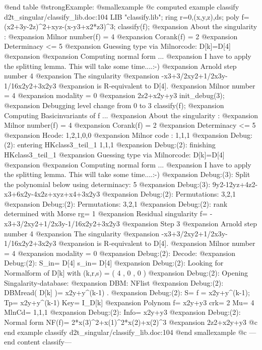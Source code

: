 @end table
@strong{Example:}
@smallexample
@c computed example classify d2t_singular/classify_lib.doc:104 
LIB "classify.lib";
ring r=0,(x,y,z),ds;
poly f=(x2+3y-2z)^2+xyz-(x-y3+x2*z3)^3;
classify(f);
@expansion{} About the singularity :
@expansion{}           Milnor number(f)   = 4
@expansion{}           Corank(f)          = 2
@expansion{}           Determinacy       <= 5
@expansion{} Guessing type via Milnorcode:   D[k]=D[4]
@expansion{} 
@expansion{} Computing normal form ...
@expansion{} I have to apply the splitting lemma. This will take some time....:-)
@expansion{}    Arnold step number 4
@expansion{} The singularity
@expansion{}    -x3+3/2xy2+1/2x3y-1/16x2y2+3x2y3
@expansion{} is R-equivalent to D[4].
@expansion{}    Milnor number = 4
@expansion{}    modality      = 0
@expansion{} 2z2+x2y+y3
init_debug(3);
@expansion{} Debugging level change from  0  to  3
classify(f);
@expansion{} Computing Basicinvariants of f ...
@expansion{} About the singularity :
@expansion{}           Milnor number(f)   = 4
@expansion{}           Corank(f)          = 2
@expansion{}           Determinacy       <= 5
@expansion{} Hcode: 1,2,1,0,0
@expansion{} Milnor code :  1,1,1
@expansion{} Debug:(2):  entering HKclass3_teil_1 1,1,1
@expansion{} Debug:(2):  finishing HKclass3_teil_1
@expansion{} Guessing type via Milnorcode:   D[k]=D[4]
@expansion{} 
@expansion{} Computing normal form ...
@expansion{} I have to apply the splitting lemma. This will take some time....:-)
@expansion{} Debug:(3):  Split the polynomial below using determinacy:  5
@expansion{} Debug:(3):  9y2-12yz+4z2-x3+6x2y-4x2z+xyz+x4+3x2y3
@expansion{} Debug:(2):  Permutations: 3,2,1
@expansion{} Debug:(2):  Permutations: 3,2,1
@expansion{} Debug:(2):  rank determined with Morse rg= 1
@expansion{} Residual singularity f= -x3+3/2xy2+1/2x3y-1/16x2y2+3x2y3
@expansion{} Step 3
@expansion{}    Arnold step number 4
@expansion{} The singularity
@expansion{}    -x3+3/2xy2+1/2x3y-1/16x2y2+3x2y3
@expansion{} is R-equivalent to D[4].
@expansion{}    Milnor number = 4
@expansion{}    modality      = 0
@expansion{} Debug:(2):  Decode:
@expansion{} Debug:(2):  S_in= D[4]   s_in= D[4]                          
@expansion{} Debug:(2):  Looking for Normalform of  D[k] with (k,r,s) = ( 4 , 0 , 0 )
@expansion{} Debug:(2):  Opening Singalarity-database:  
@expansion{}  DBM: NFlist
@expansion{} Debug:(2):  DBMread( D[k] )= x2y+y^(k-1) .
@expansion{} Debug:(2):  S= f = x2y+y^(k-1);  Tp= x2y+y^(k-1) Key= I_D[k]
@expansion{} Polynom f= x2y+y3   crk= 2   Mu= 4  MlnCd= 1,1,1
@expansion{} Debug:(2):  Info= x2y+y3
@expansion{} Debug:(2):  Normal form NF(f)= 2*x(3)^2+x(1)^2*x(2)+x(2)^3
@expansion{} 2z2+x2y+y3
@c end example classify d2t_singular/classify_lib.doc:104
@end smallexample
@c ---end content classify---

